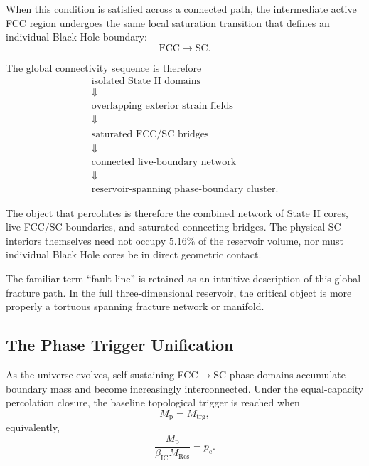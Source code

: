 When this condition is satisfied across a connected path, the intermediate active FCC region undergoes the same local saturation transition that defines an individual Black Hole boundary:
\begin{equation}
    \mathrm{FCC}
    \rightarrow
    \mathrm{SC}.
\end{equation}

The global connectivity sequence is therefore
\begin{equation}
\begin{array}{c}
    \text{isolated State II domains}
    \\
    \Downarrow
    \\
    \text{overlapping exterior strain fields}
    \\
    \Downarrow
    \\
    \text{saturated FCC/SC bridges}
    \\
    \Downarrow
    \\
    \text{connected live-boundary network}
    \\
    \Downarrow
    \\
    \text{reservoir-spanning phase-boundary cluster}.
\end{array}
\end{equation}

The object that percolates is therefore the combined network of State II cores, live FCC/SC boundaries, and saturated connecting bridges. The physical SC interiors themselves need not occupy $5.16\%$ of the reservoir volume, nor must individual Black Hole cores be in direct geometric contact.

The familiar term ``fault line'' is retained as an intuitive description of this global fracture path. In the full three-dimensional reservoir, the critical object is more properly a tortuous spanning fracture network or manifold.

\subsection{The Phase Trigger Unification}

As the universe evolves, self-sustaining FCC$\rightarrow$SC phase domains accumulate boundary mass and become increasingly interconnected. Under the equal-capacity percolation closure, the baseline topological trigger is reached when
\begin{equation}
    M_{\mathrm{p}}
    =
    M_{\mathrm{trg}},
\end{equation}
equivalently,
\begin{equation}
    \frac{M_{\mathrm{p}}}
    {\beta_{\mathrm{IC}}M_{\mathrm{Res}}}
    =
    p_{\mathrm{c}}.
\end{equation}

